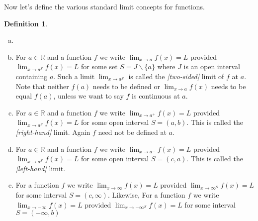\documentclass[12pt, lettersize]{book}
\theoremstyle{plain}
\theoremstyle{definition}
\newtheorem{dfn}[thm]{Definition}
\theoremstyle{remark}
\newcommand{\R}{\mathbb{R}}
\begin{document}
			Now let's define the various standard limit concepts for functions.
			\begin{dfn}
			\begin{enumerate}[(a)]
				\item[]
				\item For $a\in\R$ and a function $f$ we write $\lim_{x\rightarrow a}f(x)=L$ provided $\lim_{x\rightarrow a^S}f(x)=L$ for some set $S=J\backslash\{a\}$ where $J$ is an open interval containing $a$. Such a limit 
				$\lim_{x\rightarrow a^S}$ is called the \emph{[two-sided]} limit of $f$ at $a$. Note that neither $f(a)$ needs to be defined or $\lim_{x\rightarrow a}f(x)$ needs to be equal $f(a)$, unless we want to say $f$ is continuous at $a$.
				\item For $a\in\R$ and a function $f$ we write $\lim_{x\rightarrow a^+}f(x)=L$ provided $\lim_{x\rightarrow a^S}f(x)=L$ for some open interval $S=(a,b)$. This is called the \emph{[right-hand]} limit. Again $f$ need not
				be defined at $a$.
				\item For $a\in\R$ and a function $f$ we write $\lim_{x\rightarrow a^-}f(x)=L$ provided $\lim_{x\rightarrow a^S}f(x)=L$ for some open interval $S=(c,a)$. This is called the \emph{[left-hand]} limit.
				\item For a function $f$ we write $\lim_{x\rightarrow\infty}f(x)=L$ provided $\lim_{x\rightarrow\infty^S}f(x)=L$ for some interval $S=(c,\infty)$. Likewise, For a function $f$ we write $\lim_{x\rightarrow-\infty}f(x)=L$ provided $\lim_{x\rightarrow-\infty^S}f(x)=L$ for some interval $S=(-\infty,b)$
			\end{enumerate} 
			\end{dfn}
			
\end{document}
